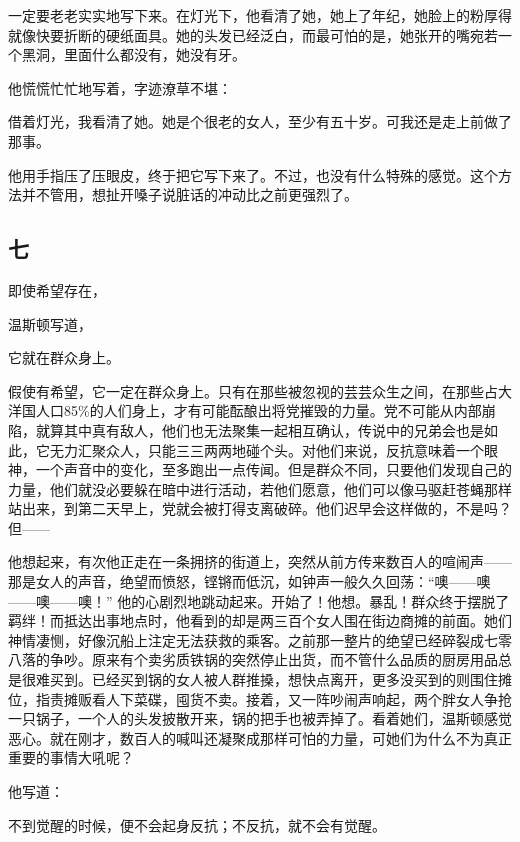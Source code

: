一定要老老实实地写下来。在灯光下，他看清了她，她上了年纪，她脸上的粉厚得就像快要折断的硬纸面具。她的头发已经泛白，而最可怕的是，她张开的嘴宛若一个黑洞，里面什么都没有，她没有牙。

他慌慌忙忙地写着，字迹潦草不堪：

借着灯光，我看清了她。她是个很老的女人，至少有五十岁。可我还是走上前做了那事。

他用手指压了压眼皮，终于把它写下来了。不过，也没有什么特殊的感觉。这个方法并不管用，想扯开嗓子说脏话的冲动比之前更强烈了。

\subsection{七}\label{ux4e03}

即使希望存在，

温斯顿写道，

它就在群众身上。

假使有希望，它一定在群众身上。只有在那些被忽视的芸芸众生之间，在那些占大洋国人口85\%的人们身上，才有可能酝酿出将党摧毁的力量。党不可能从内部崩陷，就算其中真有敌人，他们也无法聚集一起相互确认，传说中的兄弟会也是如此，它无力汇聚众人，只能三三两两地碰个头。对他们来说，反抗意味着一个眼神，一个声音中的变化，至多跑出一点传闻。但是群众不同，只要他们发现自己的力量，他们就没必要躲在暗中进行活动，若他们愿意，他们可以像马驱赶苍蝇那样站出来，到第二天早上，党就会被打得支离破碎。他们迟早会这样做的，不是吗？但------

他想起来，有次他正走在一条拥挤的街道上，突然从前方传来数百人的喧闹声------那是女人的声音，绝望而愤怒，铿锵而低沉，如钟声一般久久回荡：``噢------噢------噢------噢！''
他的心剧烈地跳动起来。开始了！他想。暴乱！群众终于摆脱了羁绊！而抵达出事地点时，他看到的却是两三百个女人围在街边商摊的前面。她们神情凄恻，好像沉船上注定无法获救的乘客。之前那一整片的绝望已经碎裂成七零八落的争吵。原来有个卖劣质铁锅的突然停止出货，而不管什么品质的厨房用品总是很难买到。已经买到锅的女人被人群推搡，想快点离开，更多没买到的则围住摊位，指责摊贩看人下菜碟，囤货不卖。接着，又一阵吵闹声响起，两个胖女人争抢一只锅子，一个人的头发披散开来，锅的把手也被弄掉了。看着她们，温斯顿感觉恶心。就在刚才，数百人的喊叫还凝聚成那样可怕的力量，可她们为什么不为真正重要的事情大吼呢？

他写道：

不到觉醒的时候，便不会起身反抗；不反抗，就不会有觉醒。

